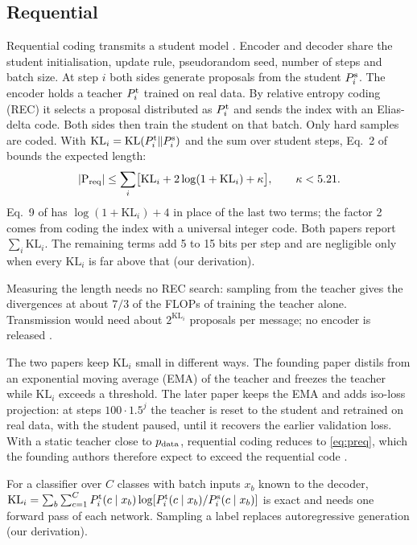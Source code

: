 \documentclass[11pt]{article}
\newcommand{\KL}{\mathrm{KL}}\newcommand{\MDL}{\mathrm{MDL}}\newcommand{\Poly}{\mathrm{Poly}}
\theoremstyle{tight}
\begin{document}
\subsection{Requential}\label{sec:req}
Requential coding transmits a student model \citep{qiu2026requential}. Encoder and decoder share the
student initialisation, update rule, pseudorandom seed, number of steps and batch size. At step $i$
both sides generate proposals from the student $P^{\rm s}_i$. The encoder holds a teacher $P^{\rm t}_i$
trained on real data. By relative entropy coding (REC) it selects a proposal distributed as $P^{\rm
t}_i$ and sends the index with an Elias-delta code. Both sides then train the student on that batch.
Only hard samples are coded. With $\KL_i=\KL(P^{\rm t}_i\|P^{\rm s}_i)$ and the sum over student
steps, Eq.~2 of \citet{qiu2026requential} bounds the expected length:
\begin{equation}\label{eq:req}
|\prog_{\rm req}|\le\sum_i\bigl[\KL_i+2\log(1+\KL_i)+\kappa\bigr],\qquad\kappa<5.21 .
\end{equation}
Eq.~9 of \citet{finzi2026epiplexity} has $\log(1+\KL_i)+4$ in place of the last two terms; the factor 2
comes from coding the index with a universal integer code. Both papers report $\sum_i\KL_i$. The
remaining terms add 5 to 15 bits per step and are negligible only when every $\KL_i$ is far above that
(our derivation).

Measuring the length needs no REC search: sampling from the teacher gives the divergences at about
$7/3$ of the FLOPs of training the teacher alone. Transmission would need about $2^{\KL_i}$ proposals
per message; no encoder is released \citep{qiu2026requential}.

The two papers keep $\KL_i$ small in different ways. The founding paper distils from an exponential
moving average (EMA) of the teacher and freezes the teacher while $\KL_i$ exceeds a threshold. The
later paper keeps the EMA and adds iso-loss projection: at steps $100\cdot1.5^j$ the teacher is reset
to the student and retrained on real data, with the student paused, until it recovers the earlier
validation loss. With a static teacher close to $p_{\rm data}$, requential coding reduces to
\eqref{eq:preq}, which the founding authors therefore expect to exceed the requential code
\citep[App.~B.2]{finzi2026epiplexity}.

For a classifier over $C$ classes with batch inputs $x_b$ known to the decoder,
$\KL_i=\sum_b\sum_{c=1}^{C}P^{\rm t}_i(c\mid x_b)\log[P^{\rm t}_i(c\mid x_b)/P^{\rm s}_i(c\mid x_b)]$
is exact and needs one forward pass of each network. Sampling a label replaces autoregressive
generation (our derivation).
\end{document}
